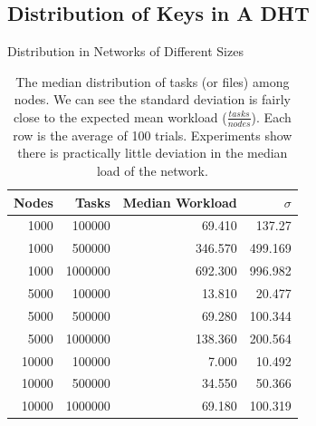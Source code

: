 \documentclass[11pt]{beamer}
\begin{document}


\subsection{Distribution of Keys in A DHT}


\begin{frame}{Distribution in Networks of Different Sizes}
\begin{table}
	\centering
	\caption{The median distribution of tasks (or files) among nodes.  We can see the standard deviation is fairly close to the expected mean workload ($\frac{tasks}{nodes}$). Each row is the average of 100 trials.  Experiments show there is practically little deviation in the median load of the network.}
	\begin{tabular}{r r r r}
		Nodes & Tasks & Median Workload & $\sigma$ \\ \hline
		1000 & 100000 & 69.410   &  137.27  \\
		1000 & 500000 & 346.570  &  499.169 \\
		1000 & 1000000 & 692.300  &  996.982 \\
		
		5000 & 100000  & 13.810 & 20.477 \\ 
		5000 & 500000  & 69.280 & 100.344 \\ 
		5000 & 1000000 &138.360 & 200.564 \\ 
		
		10000 & 100000 & 7.000   &  10.492 \\
		10000 & 500000 & 34.550  &   50.366 \\
		10000 & 1000000& 69.180  &  100.319 \\
	\end{tabular}
	\label{tab:medianLoads}
\end{table}

\end{frame}

\end{document}
